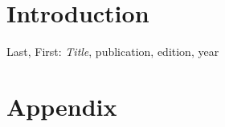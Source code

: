 \documentclass[a4, english, twoside]{article}
\begin{document}
\maketitle

\begin{abstract}
\noindent

\end{abstract}

\tableofcontents

\newpage
\section{Introduction} \label{sec:intro}



\begin{thebibliography}{9}
    Last, First: \emph{Title}, publication, edition, year
\end{thebibliography}



\newpage
\appendix
\section{Appendix}
\end{document}
